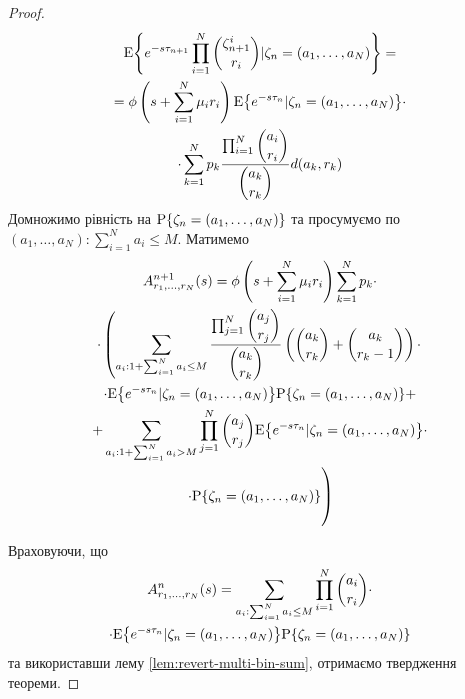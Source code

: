 \documentclass{KnuBulletin}
\begin{document}
\begin{multicols}{2}
\begin{proof}
    
    \begin{multline*}
    {{\rm E}{\left\{ e^{-s \tau_{n+1}} \prod_{i=1}^N \dbinom{\zeta_{n+1}^i}{r_i} |
        \zeta_n=(a_1,\dots,a_N)\right\}}}
    =\\=
    \phi\left(s+\sum_{i=1}^N \mu_i r_i\right){{\rm E}{\left\{ e^{-s \tau_{n}} | \zeta_n=(a_1,\dots,a_N)\right\}}}
    \cdot\\\cdot
    \sum_{k=1}^N p_k
    \frac{
        \prod_{i=1}^N \dbinom{a_i}{r_i}
    }{
    \dbinom{a_k}{r_k}
    }d(a_k,r_k)
    \end{multline*}
    Домножимо рівність на ${{\rm P}{\left\{\zeta_n=(a_1,\dots,a_N)\right\}}}$ та просумуємо по $(a_1,\dots,a_N)\colon \sum_{i=1}^N a_i \le M$. Матимемо
    \begin{multline*}
    A_{r_1,...,r_N}^{n+1}(s)
    =\phi\left(s+\sum_{i=1}^N \mu_i r_i\right)
    \sum_{k=1}^N p_k
    \cdot\\\cdot
    \left(\sum_{a_i: 1+\sum_{i=1}^N a_i \le M}
    \frac{\prod_{j=1}^N \dbinom{a_j}{r_j}}{\dbinom{a_k}{r_k}}
    \left(\dbinom{a_k}{r_k}+\dbinom{a_k}{r_k-1}\right)
    \cdot
    \right.\\\left.
    \cdot
    {{\rm E}{\left\{ e^{-s \tau_{n}} | \zeta_n=(a_1,\dots,a_N)\right\}}}
    {{\rm P}{\left\{\zeta_n=(a_1,\dots,a_N)\right\}}}
    +
    \right.\\\left.
    +
    \sum_{a_i: 1+\sum_{i=1}^N a_i > M}
    \prod_{j=1}^N \dbinom{a_j}{r_j}
    {{\rm E}{\left\{ e^{-s \tau_{n}} | \zeta_n=(a_1,\dots,a_N)\right\}}}
    \cdot
    \right.\\\left.
    \cdot
    {{\rm P}{\left\{\zeta_n=(a_1,\dots,a_N)\right\}}}
    \vphantom{\sum^\sum}
    \right)
    \end{multline*}
    
    Враховуючи, що
    \begin{multline*}
    \label{eq:cond-expactation-multi}
    A_{r_1,...,r_N}^{n}(s)
    =
    \sum_{a_i: \sum_{i=1}^N a_i \le M}
    \prod_{i=1}^N \dbinom{a_i}{r_i}
    \cdot\\\cdot
    {{\rm E}{\left\{ e^{-s \tau_{n}} | \zeta_n=(a_1,\dots,a_N)\right\}}}
    {{\rm P}{\left\{\zeta_n=(a_1,\dots,a_N)\right\}}}
    \end{multline*}
    та використавши лему \ref{lem:revert-multi-bin-sum}, отримаємо твердження
    теореми. 
\end{proof}    


\end{multicols}
\end{document}
